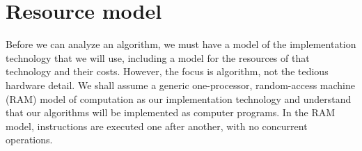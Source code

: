 \section{Resource model}


Before we can analyze an algorithm, we must have a model of the implementation technology that we will use, including a model for the resources of that technology and their costs. 
However, the focus is algorithm, not the tedious hardware detail.
We shall assume a generic one-processor, random-access machine (RAM) model of computation as our implementation technology and understand
that our algorithms will be implemented as computer programs.
In the RAM model, instructions are executed one after another, with no concurrent operations.



